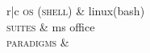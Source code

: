 \documentclass[12pt]{article}
\newcommand{\tableentry}[3]{\textsc{#1} & #2\expandafter\ifstrequal\expandafter{#3}{}{\\}{\\[6pt]}}
\begin{document}
\begin{paracol}{2}
\begin{supertabular}{r|c}
  \tableentry{\footnotesize os (shell)}{\footnotesize linux(bash)}{}

  \tableentry{\footnotesize suites}{\footnotesize  ms office}{}
    

  \tableentry{\footnotesize paradigms}{\footnotesize}{}

\end{supertabular}


%
%

\switchcolumn     %



\end{paracol}

\vspace*{\fill}
\end{document}
